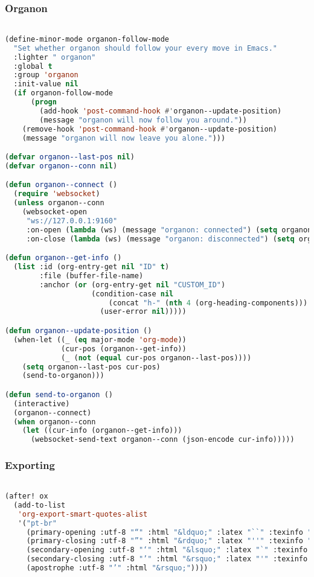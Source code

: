 \documentclass[11pt]{article}
\begin{document}
\subsubsection{Organon}
\label{sec:organon}
\begin{lstlisting}[language=Lisp]%! Someone please complete this list for me

(define-minor-mode organon-follow-mode
  "Set whether organon should follow your every move in Emacs."
  :lighter " organon"
  :global t
  :group 'organon
  :init-value nil
  (if organon-follow-mode
      (progn
        (add-hook 'post-command-hook #'organon--update-position)
        (message "organon will now follow you around."))
    (remove-hook 'post-command-hook #'organon--update-position)
    (message "organon will now leave you alone.")))

(defvar organon--last-pos nil)
(defvar organon--conn nil)

(defun organon--connect ()
  (require 'websocket)
  (unless organon--conn
    (websocket-open
     "ws://127.0.0.1:9160"
     :on-open (lambda (ws) (message "organon: connected") (setq organon--conn ws))
     :on-close (lambda (ws) (message "organon: disconnected") (setq organon--conn nil)))))

(defun organon--get-info ()
  (list :id (org-entry-get nil "ID" t)
        :file (buffer-file-name)
        :anchor (or (org-entry-get nil "CUSTOM_ID")
                    (condition-case nil
                        (concat "h-" (nth 4 (org-heading-components)))
                      (user-error nil)))))

(defun organon--update-position ()
  (when-let ((_ (eq major-mode 'org-mode))
             (cur-pos (organon--get-info))
             (_ (not (equal cur-pos organon--last-pos))))
    (setq organon--last-pos cur-pos)
    (send-to-organon)))

(defun send-to-organon ()
  (interactive)
  (organon--connect)
  (when organon--conn
    (let ((cur-info (organon--get-info)))
      (websocket-send-text organon--conn (json-encode cur-info)))))
\end{lstlisting}

\subsubsection{Exporting}
\label{sec:exporting}
\begin{lstlisting}[language=Lisp]%! Someone please complete this list for me

(after! ox
  (add-to-list
   'org-export-smart-quotes-alist
   '("pt-br"
     (primary-opening :utf-8 "“" :html "&ldquo;" :latex "``" :texinfo "``")
     (primary-closing :utf-8 "”" :html "&rdquo;" :latex "''" :texinfo "''")
     (secondary-opening :utf-8 "‘" :html "&lsquo;" :latex "`" :texinfo "`")
     (secondary-closing :utf-8 "’" :html "&rsquo;" :latex "'" :texinfo "'")
     (apostrophe :utf-8 "’" :html "&rsquo;"))))
\end{lstlisting}
\end{document}
